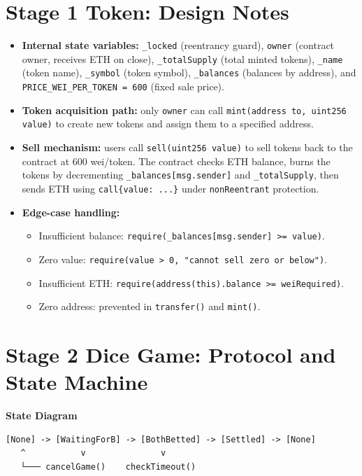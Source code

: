 \documentclass[10pt,a4paper]{article}
\begin{document}
\section{Stage 1 Token: Design Notes}
\begin{itemize}
  \item \textbf{Internal state variables:} \texttt{\_locked} (reentrancy guard), \texttt{owner} (contract owner, receives ETH on close), \texttt{\_totalSupply} (total minted tokens), \texttt{\_name} (token name), \texttt{\_symbol} (token symbol), \texttt{\_balances} (balances by address), and \texttt{PRICE\_WEI\_PER\_TOKEN = 600} (fixed sale price).
  \item \textbf{Token acquisition path:} only \texttt{owner} can call \texttt{mint(address to, uint256 value)} to create new tokens and assign them to a specified address.
  \item \textbf{Sell mechanism:} users call \texttt{sell(uint256 value)} to sell tokens back to the contract at 600 wei/token. The contract checks ETH balance, burns the tokens by decrementing \texttt{\_balances[msg.sender]} and \texttt{\_totalSupply}, then sends ETH using \texttt{call\{value: ...\}} under \texttt{nonReentrant} protection.
  \item \textbf{Edge-case handling:}
  \begin{itemize}
    \item Insufficient balance: \texttt{require(\_balances[msg.sender] >= value)}.
    \item Zero value: \texttt{require(value > 0, "cannot sell zero or below")}.
    \item Insufficient ETH: \texttt{require(address(this).balance >= weiRequired)}.
    \item Zero address: prevented in \texttt{transfer()} and \texttt{mint()}.
  \end{itemize}
\end{itemize}

\section{Stage 2 Dice Game: Protocol and State Machine}
\noindent\textbf{State Diagram}

\begin{center}
\begin{verbatim}
[None] -> [WaitingForB] -> [BothBetted] -> [Settled] -> [None]
   ^           v               v
   └─── cancelGame()    checkTimeout()
\end{verbatim}
\end{center}
\end{document}

